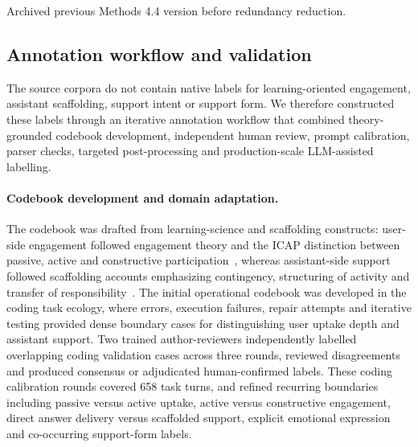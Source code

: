 
\iffalse
Archived previous Methods 4.4 version before redundancy reduction.

\subsection{Annotation workflow and validation}

The source corpora do not contain native labels for learning-oriented engagement, assistant scaffolding, support intent or support form. We therefore constructed these labels through an iterative annotation workflow that combined theory-grounded
codebook development, independent human review, prompt calibration, parser checks, targeted post-processing and production-scale LLM-assisted labelling.

\paragraph{Codebook development and domain adaptation.}
The codebook was drafted from learning-science and scaffolding constructs: user-side engagement followed engagement theory and the ICAP distinction between passive, active and constructive participation~\cite{fredricks2004school,chi2014icap}, whereas
assistant-side support followed scaffolding accounts emphasizing contingency, structuring of activity and transfer of responsibility~\cite{wood1976role,van2010scaffolding,quintana2018scaffolding,reiser2004scaffolding}.
The initial operational codebook was developed in the coding task ecology, where errors, execution failures, repair attempts and iterative testing provided dense boundary
cases for distinguishing user uptake depth and assistant support. Two trained author-reviewers independently labelled overlapping coding validation cases across three rounds, reviewed disagreements and produced consensus or adjudicated
human-confirmed labels. These coding calibration rounds covered 658 task turns, and refined recurring boundaries including passive versus active uptake, active versus constructive engagement, direct answer delivery versus scaffolded support, explicit emotional expression and co-occurring support-form labels.

